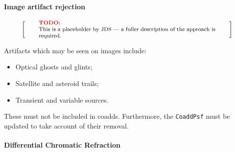 \documentclass[12pt]{article}
\newenvironment{note}[1][Note]
{
  \begin{displaymath}
    \left[ \qquad
    \begin{minipage}[h]{.75\linewidth}
      \color{red} \footnotesize
      \textbf{#1:} \newline
      \color{black}
}
{
    \end{minipage}
    \normalsize
    \qquad \right]
  \end{displaymath}
}
\begin{document}

\paragraph{Image artifact rejection}

\begin{note}[TODO]
This is a placeholder by JDS --- a fuller description of the approach is required.
\end{note}

Artifacts which may be seen on images include:

\begin{itemize}
  \item{Optical ghosts and glints;}
  \item{Satellite and asteroid trails;}
  \item{Transient and variable sources.}
\end{itemize}

These must not be included in coadds. Furthermore, the \texttt{CoaddPsf} must be updated to take account of their removal.

\paragraph{Differential Chromatic Refraction}
\end{document}
